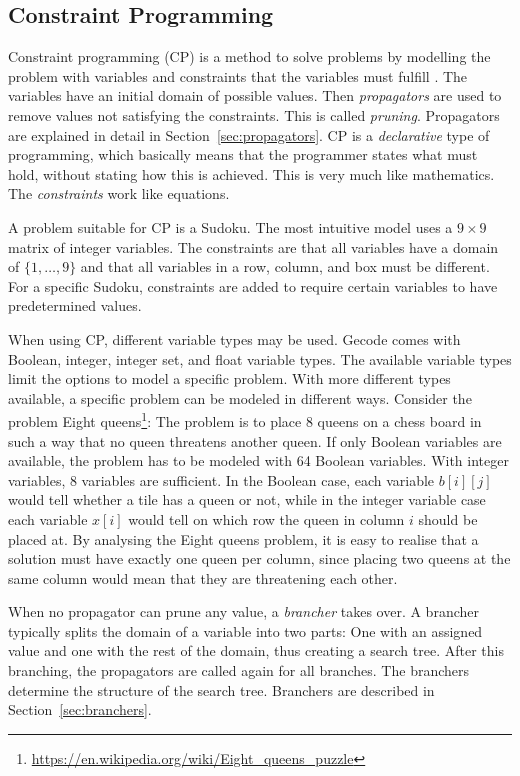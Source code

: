 \documentclass[a4paper,11pt]{article}
\begin{document}
\subsection{Constraint Programming}
\label{sec:constraintp}
Constraint programming (CP) is a method to solve problems by modelling the problem with variables and constraints that the variables must fulfill \cite{FruehwirthMS06}. The variables have an initial domain of possible values. Then \textit{propagators} are used to remove values not satisfying the constraints. This is called \textit{pruning}. Propagators are explained in detail in Section~\ref{sec:propagators}. CP is a \textit{declarative} type of programming, which basically means that the programmer states what must hold, without stating how this is achieved. This is very much like mathematics. The \textit{constraints} work like equations.

A problem suitable for CP is a Sudoku. The most intuitive model uses a $9\times9$ matrix of integer variables. The constraints are that all variables have a domain of $\{1,\ldots,9\}$ and that all variables in a row, column, and box must be different. For a specific Sudoku, constraints are added to require certain variables to have predetermined values.

When using CP, different variable types may be used. Gecode comes with Boolean, integer, integer set, and float variable types. The available variable types limit the options to model a specific problem. With more different types available, a specific problem can be modeled in different ways. Consider the problem Eight queens\footnote{\url{https://en.wikipedia.org/wiki/Eight_queens_puzzle}}: The problem is to place 8 queens on a chess board in such a way that no queen threatens another queen. If only Boolean variables are available, the problem has to be modeled with 64 Boolean variables. With integer variables, 8 variables are sufficient. In the Boolean case, each variable $b[i][j]$ would tell whether a tile has a queen or not, while in the integer variable case each variable $x[i]$ would tell on which row the queen in column $i$ should be placed at. By analysing the Eight queens problem, it is easy to realise that a solution must have exactly one queen per column, since placing two queens at the same column would mean that they are threatening each other. 

When no propagator can prune any value, a \textit{brancher} takes over. A brancher typically splits the domain of a variable into two parts: One with an assigned value and one with the rest of the domain, thus creating a search tree. After this branching, the propagators are called again for all branches. The branchers determine the structure of the search tree. Branchers are described in Section~\ref{sec:branchers}. 
\end{document}
